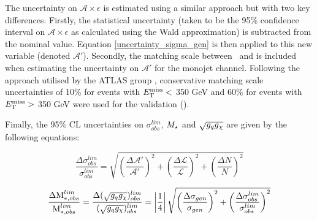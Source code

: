 
The uncertainty on $\mathcal{A} \times \epsilon$ is estimated using a similar approach but with two key differences. Firstly, the statistical uncertainty (taken to be the 95\% confidence interval on $\mathcal{A}\times\epsilon$ as calculated using the Wald approximation) is subtracted from the nominal value. Equation \ref{uncertainty_sigma_gen} is then applied to this new variable (denoted $\mathcal{A}'$). Secondly, the matching scale between \MG\mbox{ }and \PYTHIA is included when estimating the uncertainty on $\mathcal{A}'$ for the monojet channel. Following the approach utilised by the ATLAS group \cite{CERN-THESIS-2015-038}, conservative matching scale uncertainties of 10\% for events with $E_{\mathrm{T}}^{\mathrm{miss}} <$ 350 GeV and 60\% for events with $E_{\mathrm{T}}^{\mathrm{miss}} >$ 350 GeV were used for the validation ().


Finally, the 95\% CL uncertainties on $\sigma_{obs}^{lim}$, $M_{\star}$ and $\sqrt{g_q g_{\chi}}$ are given by the following equations:

\begin{equation}
\label{uncertainty_sigma_lim}
\frac{\Delta \sigma_{obs}^{lim}}{\sigma_{obs}^{lim}} = \sqrt{\left(\frac{\Delta \mathcal{A}'}{\mathcal{A}'}\right)^{2} + \left(\frac{\Delta \mathcal{L}}{\mathcal{L}}\right)^{2} + \left(\frac{\Delta N}{N}\right)^{2}}
\end{equation}

\begin{equation}
\label{uncertainty_M_star}
\frac{\Delta \mbox{M}_{*,obs}^{lim}}{\mbox{M}_{*,obs}^{lim}} = \frac{\Delta (\sqrt{g_q g_{\chi}})_{obs}^{lim}}{(\sqrt{g_q g_{\chi}})_{obs}^{lim}} = \left|\frac{1}{4}\right|\sqrt{\left(\frac{\Delta \sigma_{gen}}{\sigma_{gen}}\right)^{2} + \left(\frac{\Delta \sigma_{obs}^{lim}}{\sigma_{obs}^{lim}}\right)^{2}}
\end{equation}


\fi
